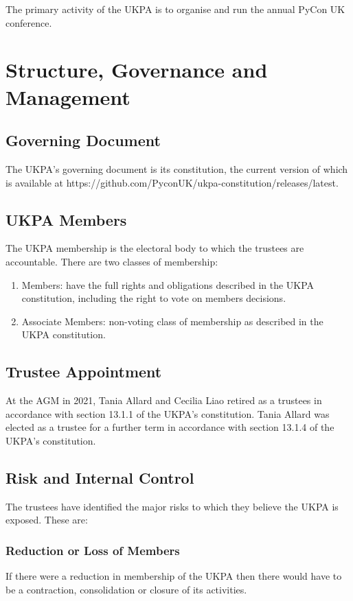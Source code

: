 \documentclass[11pt, final]{article}
\begin{document}
The primary activity of the UKPA is to organise and run the annual PyCon UK conference.

\section{Structure, Governance and Management}

\subsection{Governing Document}
The UKPA's governing document is its constitution, the current version of which is available at https://github.com/PyconUK/ukpa-constitution/releases/latest.

\subsection{UKPA Members}
The UKPA membership is the electoral body to which the trustees are accountable.
There are two classes of membership:

\begin{enumerate}
	\item Members: have the full rights and obligations described in the UKPA constitution, including the right to vote on members decisions.
	\item Associate Members: non-voting class of membership as described in the UKPA constitution.
\end{enumerate}

\subsection{Trustee Appointment}
At the AGM in 2021, Tania Allard and Cecilia Liao retired as a trustees in accordance with section 13.1.1 of the UKPA's constitution.
Tania Allard was elected as a trustee for a further term in accordance with section 13.1.4 of the UKPA's constitution.

\subsection{Risk and Internal Control}
The trustees have identified the major risks to which they believe the UKPA is exposed. These are:

\subsubsection{Reduction or Loss of Members}
If there were a reduction in membership of the UKPA then there would have to be a contraction, consolidation or closure of its activities.
\end{document}
